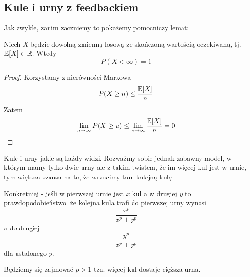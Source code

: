 \newpage
\subsection{Kule i urny z feedbackiem}

Jak zwykle, zanim zaczniemy to pokażemy pomocniczy lemat:
\begin{lemma}
    \label{if-expected-is-finite-then-variable-is-finite}
    Niech \( X \) będzie dowolną zmienną losową ze skończoną wartością oczekiwaną, tj. \( \expected{X} \in \real \).
    Wtedy
    \[
        P(X < \infty) = 1
    \]
\end{lemma}
\begin{proof}
    Korzystamy z nierówności Markowa
    \[
        P(X \geq n) \leq \frac{\expected{X}}{n}
    \]
    Zatem
    \[
        \lim_{n \rightarrow \infty} P(X \geq n) \leq \lim_{n \rightarrow \infty} \frac{\expected{X}}{n} = 0
    \]
\end{proof}


Kule i urny jakie są każdy widzi. Rozważmy sobie jednak zabawny model, w którym mamy tylko dwie urny ale z takim twistem, że im więcej kul jest w urnie, tym większa szansa na to, że wrzucimy tam kolejną kulę.

Konkretniej - jeśli w pierwszej urnie jest \( x \) kul a w drugiej \( y \) to prawdopodobieństwo, że kolejna kula trafi do pierwszej urny wynosi \[ \frac{x^p}{x^p + y^p} \] a do drugiej \[ \frac{y^p}{x^p + y^p} \] 
dla ustalonego \( p \).

Będziemy się zajmować \( p > 1 \) tzn. więcej kul dostaje cięższa urna.

